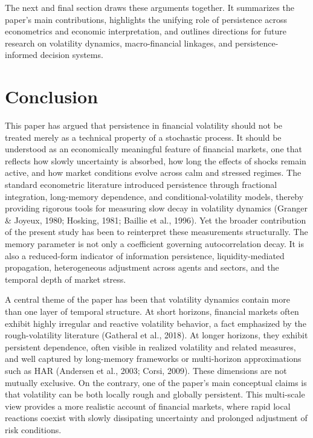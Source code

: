 \documentclass[12pt]{article}
\begin{document}
The next and final section draws these arguments together. It summarizes the paper's main contributions, highlights the unifying role of persistence across econometrics and economic interpretation, and outlines directions for future research on volatility dynamics, macro-financial linkages, and persistence-informed decision systems.



\section{Conclusion}
\label{sec:conclusion}

This paper has argued that persistence in financial volatility should not be treated merely as a technical property of a stochastic process. It should be understood as an economically meaningful feature of financial markets, one that reflects how slowly uncertainty is absorbed, how long the effects of shocks remain active, and how market conditions evolve across calm and stressed regimes. The standard econometric literature introduced persistence through fractional integration, long-memory dependence, and conditional-volatility models, thereby providing rigorous tools for measuring slow decay in volatility dynamics (Granger \& Joyeux, 1980; Hosking, 1981; Baillie et al., 1996). Yet the broader contribution of the present study has been to reinterpret these measurements structurally. The memory parameter is not only a coefficient governing autocorrelation decay. It is also a reduced-form indicator of information persistence, liquidity-mediated propagation, heterogeneous adjustment across agents and sectors, and the temporal depth of market stress.

A central theme of the paper has been that volatility dynamics contain more than one layer of temporal structure. At short horizons, financial markets often exhibit highly irregular and reactive volatility behavior, a fact emphasized by the rough-volatility literature (Gatheral et al., 2018). At longer horizons, they exhibit persistent dependence, often visible in realized volatility and related measures, and well captured by long-memory frameworks or multi-horizon approximations such as HAR (Andersen et al., 2003; Corsi, 2009). These dimensions are not mutually exclusive. On the contrary, one of the paper's main conceptual claims is that volatility can be both locally rough and globally persistent. This multi-scale view provides a more realistic account of financial markets, where rapid local reactions coexist with slowly dissipating uncertainty and prolonged adjustment of risk conditions.
\end{document}
